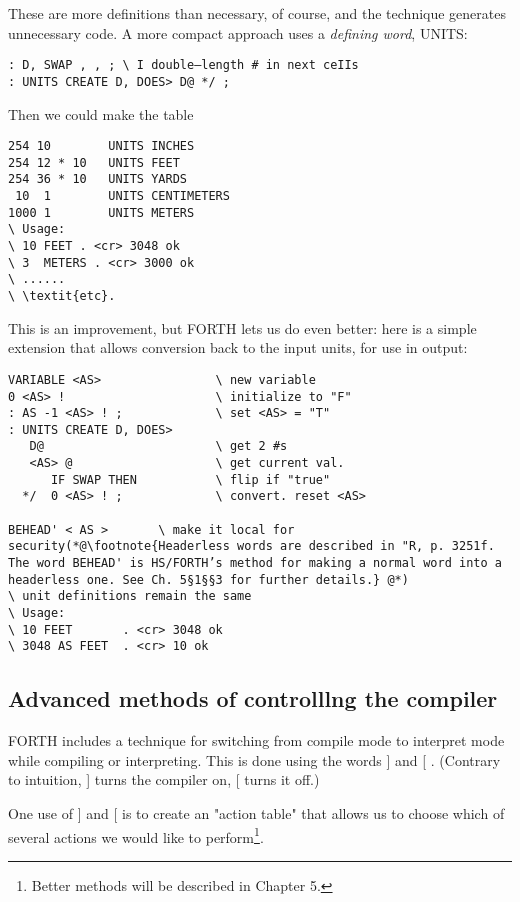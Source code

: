 These are more definitions than necessary, of course, and the technique generates unnecessary code. A more compact approach uses a \textit{defining word}, UNITS:

\begin{lstlisting}
: D, SWAP , , ; \ I double—length # in next ceIIs
: UNITS CREATE D, DOES> D@ */ ;
\end{lstlisting}

Then we could make the table
\begin{lstlisting}
254 10        UNITS INCHES
254 12 * 10   UNITS FEET
254 36 * 10   UNITS YARDS
 10  1        UNITS CENTIMETERS
1000 1        UNITS METERS
\ Usage:
\ 10 FEET . <cr> 3048 ok
\ 3  METERS . <cr> 3000 ok
\ ......
\ \textit{etc}.
\end{lstlisting}

This is an improvement, but FORTH lets us do even better: here is a simple extension that allows conversion back to the input units, for use in output:

\begin{lstlisting}
VARIABLE <AS>                \ new variable
0 <AS> !                     \ initialize to "F"
: AS -1 <AS> ! ;             \ set <AS> = "T"
: UNITS CREATE D, DOES>
   D@                        \ get 2 #s
   <AS> @                    \ get current val.
      IF SWAP THEN           \ flip if "true"
  */  0 <AS> ! ;             \ convert. reset <AS>

BEHEAD' < AS >       \ make it local for security(*@\footnote{Headerless words are described in "R, p. 3251f. The word BEHEAD' is HS/FORTH’s method for making a normal word into a headerless one. See Ch. 5§1§§3 for further details.} @*)
\ unit definitions remain the same
\ Usage:
\ 10 FEET       . <cr> 3048 ok
\ 3048 AS FEET  . <cr> 10 ok
\end{lstlisting}

\subsection{Advanced methods of controlllng the compiler}
FORTH includes a technique for switching from compile mode to interpret mode while compiling or interpreting. This is done using the words ] and [ . (Contrary to intuition, ] turns the
compiler on, [ turns it off.)

One use of ] and [ is to create an "action table" that allows us to choose which of several actions we would like to perform\footnote{Better methods will be described in Chapter 5.}.

